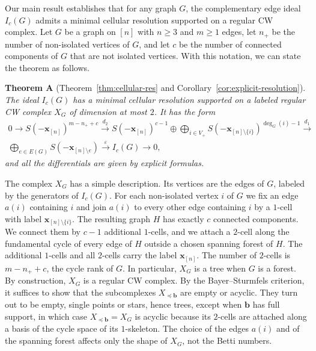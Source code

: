 \documentclass[12pt]{amsart}
\begin{document}
Our main result establishes that for any graph $G$, the complementary edge ideal $I_c(G)$ admits a minimal cellular resolution supported on a regular CW complex. Let $G$ be a graph on $[n]$ with $n\geq 3$ and $m\geq 1$ edges, let $n_+$ be the number of non-isolated vertices of $G$, and let $c$ be the number of connected components of $G$ that are not isolated vertices. With this notation, we can state the theorem as follows.
\smallskip

 \noindent\textbf{Theorem A} (Theorem~\ref{thm:cellular-res} and Corollary~\ref{cor:explicit-resolution}).
\emph{The ideal $I_c(G)$ has a minimal cellular resolution supported on a labeled regular CW complex $X_G$ of dimension at most $2$. It has the form}
\begin{multline*}
	0 \longrightarrow S(-\mathbf x_{[n]})^{m-n_++c}
	\xrightarrow{\ d_2\ }
	S(-\mathbf x_{[n]})^{c-1} \oplus \bigoplus_{i\in V_+} S(-\mathbf x_{[n]\setminus\{i\}})^{\deg_G(i)-1}
	\xrightarrow{\ d_1\ }\\
	\bigoplus_{e \in E(G)} S(-\mathbf x_{[n]\setminus e})
	\xrightarrow{\ \varepsilon\ }
	I_c(G) \longrightarrow 0,
\end{multline*}
\emph{and all the differentials are given by explicit formulas.}
\smallskip 

The complex $X_G$ has a simple description. Its vertices are the edges of $G$, labeled by the generators of $I_c(G)$. For each non-isolated vertex $i$ of $G$ we fix an edge $a(i)$ containing $i$ and join $a(i)$ to every other edge containing $i$ by a $1$-cell with label $\mathbf x_{[n]\setminus\{i\}}$. The resulting graph $H$ has exactly $c$ connected components. We connect them by $c-1$ additional $1$-cells, and we attach a $2$-cell along the fundamental cycle of every edge of $H$ outside a chosen spanning forest of $H$. The additional $1$-cells and all $2$-cells carry the label $\mathbf x_{[n]}$. The number of $2$-cells is $m-n_++c$, the cycle rank of $G$. In particular, $X_G$ is a tree when $G$ is a forest. By construction, $X_G$ is a regular CW complex. By the Bayer--Sturmfels criterion, it suffices to show that the subcomplexes $X_{\preceq\mathbf b}$ are empty or acyclic. They turn out to be empty, single points or stars, hence trees, except when $\mathbf b$ has full support, in which case $X_{\preceq\mathbf b}=X_G$ is acyclic because its $2$-cells are attached along a basis of the cycle space of its $1$-skeleton. The choice of the edges $a(i)$ and of the spanning forest affects only the shape of $X_G$, not the Betti numbers.
\end{document}
